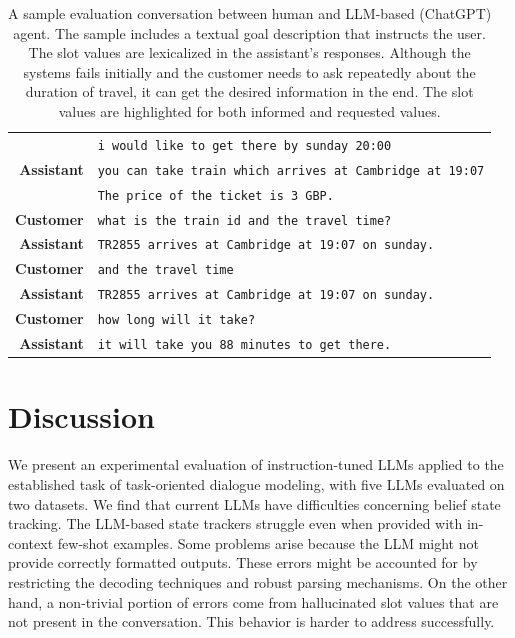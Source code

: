 \begin{table}[tp]
\begin{tabular}{r|l}
        & \texttt{i would like to get there by {\color{cyan!80!yellow!80!black!100 }sunday 20:00}} \\
        \textbf{Assistant} & \texttt{you can take train which arrives at Cambridge at  {\color{orange!50!yellow!90!black!100!}19:07}} \\
        & \texttt{The price of the ticket is {\color{orange!50!yellow!90!black!100!}3 GBP}.} \\
        \textbf{Customer} & \texttt{what is the {\color{orange!50!yellow!90!black!100!}train id} and the {\color{orange!50!yellow!90!black!100!}travel time?}} \\
        \textbf{Assistant} & \texttt{{\color{orange!50!yellow!90!black!100!}TR2855} arrives at Cambridge at 19:07 on sunday.} \\
        \textbf{Customer} & \texttt{and the travel time} \\
        \textbf{Assistant} & \texttt{{\color{red!100!yellow!90!black!100!}TR2855 arrives at Cambridge at 19:07 on sunday.}} \\
        \textbf{Customer} & \texttt{how long will it take?} \\
        \textbf{Assistant} & \texttt{it will take you {\color{orange!50!yellow!90!black!100!}88 minutes} to get there. }\\
        \bottomrule
    \end{tabular}
    \caption{A sample evaluation conversation between human and LLM-based (ChatGPT) agent. The sample includes a textual goal description that instructs the user. The slot values are lexicalized in the assistant's responses. Although the systems {\color{red!100!yellow!90!black!100!}fails initially} and the customer needs to ask repeatedly about the duration of travel, it can get the desired information in the end. The slot values are highlighted for both {\color{cyan!80!yellow!80!black!100 }informed} and {\color{orange!50!yellow!90!black!100!}requested} values.}
    \label{07:tab:human-1}
\end{table}
\section{Discussion}
We present an experimental evaluation of instruction-tuned LLMs applied to the established task of task-oriented dialogue modeling, with five LLMs evaluated on two datasets.
We find that current LLMs have difficulties concerning belief state tracking.
The LLM-based state trackers struggle even when provided with in-context few-shot examples.
Some problems arise because the LLM might not provide correctly formatted outputs.
These errors might be accounted for by restricting the decoding techniques and robust parsing mechanisms.
On the other hand, a non-trivial portion of errors come from hallucinated slot values that are not present in the conversation.
This behavior is harder to address successfully.


